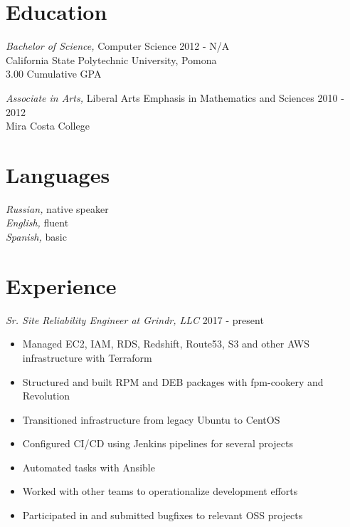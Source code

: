 \documentclass[line]{tex/res}
\begin{document}
\address{}
\address{Email: me@smaslennikov.com}

\begin{resume}

\section{Education}
\vspace{0.1in}
	{\sl Bachelor of Science,} Computer Science \hfill 2012 - N/A\\
	California State Polytechnic University, Pomona \\
	3.00 Cumulative GPA

	{\sl Associate in Arts,} Liberal Arts Emphasis in Mathematics and Sciences \hfill 2010 - 2012 \\
	Mira Costa College

\section{Languages}
	{\sl Russian,} native speaker \\
	{\sl English,} fluent \\
    {\sl Spanish,} basic

\section{Experience}
    {\sl Sr. Site Reliability Engineer at Grindr, LLC} \hfill 2017 - present
    \begin{itemize} \itemsep -2pt %
        \item Managed EC2, IAM, RDS, Redshift, Route53, S3 and other AWS infrastructure with Terraform
        \item Structured and built RPM and DEB packages with fpm-cookery and Revolution
        \item Transitioned infrastructure from legacy Ubuntu to CentOS
        \item Configured CI/CD using Jenkins pipelines for several projects
        \item Automated tasks with Ansible
        \item Worked with other teams to operationalize development efforts
        \item Participated in and submitted bugfixes to relevant OSS projects
    \end{itemize}


\end{resume}
\end{document}
